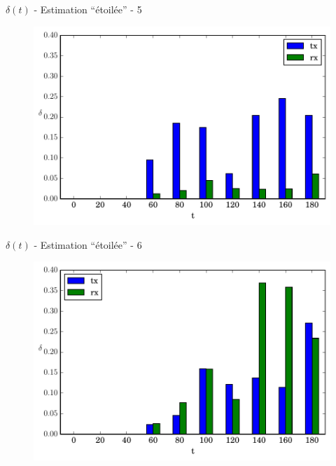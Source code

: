\begin{frame}{$\delta(t)$ - Estimation ``étoilée'' - 5}
  \begin{figure}
    \centering  
    \includegraphics[width=\textwidth]{figures/evolution_noinfo_5.pdf}
  \end{figure}
\end{frame}

\begin{frame}{$\delta(t)$ - Estimation ``étoilée'' - 6}
  \begin{figure}
    \centering  
    \includegraphics[width=\textwidth]{figures/evolution_noinfo_6.pdf}
  \end{figure}
\end{frame}


